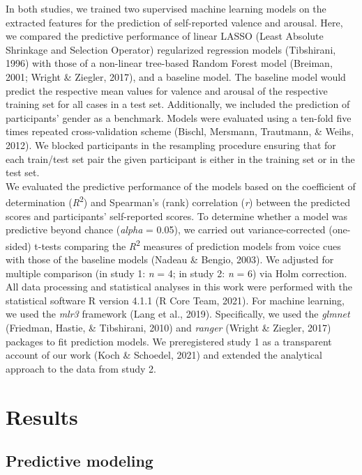 \documentclass[
  english,
  man,floatsintext]{apa6}
\begin{document}
In both studies, we trained two supervised machine learning models on the extracted features for the prediction of self-reported valence and arousal. Here, we compared the predictive performance of linear LASSO (Least Absolute Shrinkage and Selection Operator) regularized regression models (Tibshirani, 1996) with those of a non-linear tree-based Random Forest model (Breiman, 2001; Wright \& Ziegler, 2017), and a baseline model. The baseline model would predict the respective mean values for valence and arousal of the respective training set for all cases in a test set. Additionally, we included the prediction of participants' gender as a benchmark. Models were evaluated using a ten-fold five times repeated cross-validation scheme (Bischl, Mersmann, Trautmann, \& Weihs, 2012). We blocked participants in the resampling procedure ensuring that for each train/test set pair the given participant is either in the training set or in the test set.\\
We evaluated the predictive performance of the models based on the coefficient of determination (\emph{R}\textsuperscript{2}) and Spearman's (rank) correlation (\emph{r}) between the predicted scores and participants' self-reported scores. To determine whether a model was predictive beyond chance (\emph{alpha} = 0.05), we carried out variance-corrected (one-sided) t-tests comparing the \emph{R}\textsuperscript{2} measures of prediction models from voice cues with those of the baseline models (Nadeau \& Bengio, 2003). We adjusted for multiple comparison (in study 1: \emph{n} = 4; in study 2: \emph{n} = 6) via Holm correction.
All data processing and statistical analyses in this work were performed with the statistical software R version 4.1.1 (R Core Team, 2021). For machine learning, we used the \emph{mlr3} framework (Lang et al., 2019). Specifically, we used the \emph{glmnet} (Friedman, Hastie, \& Tibshirani, 2010) and \emph{ranger} (Wright \& Ziegler, 2017) packages to fit prediction models. We preregistered study 1 as a transparent account of our work (Koch \& Schoedel, 2021) and extended the analytical approach to the data from study 2.

\hypertarget{results}{%
\section{Results}\label{results}}

\hypertarget{predictive-modeling}{%
\subsection{Predictive modeling}\label{predictive-modeling}}
\end{document}
